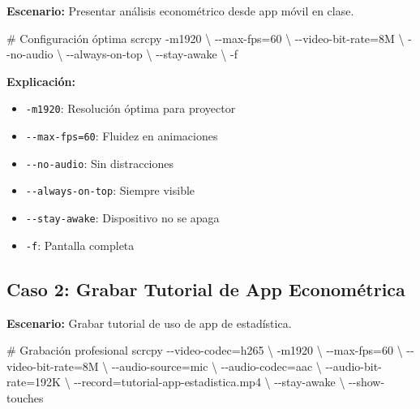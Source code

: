 \documentclass[
  doc,
  floatsintext,
  longtable,
  a4paper,
  nolmodern,
  notxfonts,
  notimes,
  12pt,
  colorlinks=true,linkcolor=blue,citecolor=blue,urlcolor=blue]{apa7}
\newenvironment{Shaded}{\begin{snugshade}}{\end{snugshade}}
\newcommand{\AttributeTok}[1]{\textcolor[rgb]{0.40,0.45,0.13}{#1}}
\newcommand{\CommentTok}[1]{\textcolor[rgb]{0.37,0.37,0.37}{#1}}
\newcommand{\DataTypeTok}[1]{\textcolor[rgb]{0.68,0.00,0.00}{#1}}
\newcommand{\ExtensionTok}[1]{\textcolor[rgb]{0.00,0.23,0.31}{#1}}
\newcommand{\NormalTok}[1]{\textcolor[rgb]{0.00,0.23,0.31}{#1}}
\newcommand{\OperatorTok}[1]{\textcolor[rgb]{0.37,0.37,0.37}{#1}}
\providecommand{\tightlist}{%
  \setlength{\itemsep}{0pt}\setlength{\parskip}{0pt}}
\begin{document}
\textbf{Escenario:} Presentar análisis econométrico desde app móvil en
clase.

\begin{Shaded}
\begin{Highlighting}[]
\CommentTok{\# Configuración óptima}
\ExtensionTok{scrcpy} \AttributeTok{{-}m1920} \DataTypeTok{\textbackslash{}}
  \AttributeTok{{-}{-}max{-}fps}\OperatorTok{=}\NormalTok{60 }\DataTypeTok{\textbackslash{}}
  \AttributeTok{{-}{-}video{-}bit{-}rate}\OperatorTok{=}\NormalTok{8M }\DataTypeTok{\textbackslash{}}
  \AttributeTok{{-}{-}no{-}audio} \DataTypeTok{\textbackslash{}}
  \AttributeTok{{-}{-}always{-}on{-}top} \DataTypeTok{\textbackslash{}}
  \AttributeTok{{-}{-}stay{-}awake} \DataTypeTok{\textbackslash{}}
  \AttributeTok{{-}f}
\end{Highlighting}
\end{Shaded}

\textbf{Explicación:}

\begin{itemize}
\tightlist
\item
  \texttt{-m1920}: Resolución óptima para proyector
\item
  \texttt{-\/-max-fps=60}: Fluidez en animaciones
\item
  \texttt{-\/-no-audio}: Sin distracciones
\item
  \texttt{-\/-always-on-top}: Siempre visible
\item
  \texttt{-\/-stay-awake}: Dispositivo no se apaga
\item
  \texttt{-f}: Pantalla completa
\end{itemize}

\subsection{Caso 2: Grabar Tutorial de App
Econométrica}\label{caso-2-grabar-tutorial-de-app-economuxe9trica}

\textbf{Escenario:} Grabar tutorial de uso de app de estadística.

\begin{Shaded}
\begin{Highlighting}[]
\CommentTok{\# Grabación profesional}
\ExtensionTok{scrcpy} \AttributeTok{{-}{-}video{-}codec}\OperatorTok{=}\NormalTok{h265 }\DataTypeTok{\textbackslash{}}
  \AttributeTok{{-}m1920} \DataTypeTok{\textbackslash{}}
  \AttributeTok{{-}{-}max{-}fps}\OperatorTok{=}\NormalTok{60 }\DataTypeTok{\textbackslash{}}
  \AttributeTok{{-}{-}video{-}bit{-}rate}\OperatorTok{=}\NormalTok{8M }\DataTypeTok{\textbackslash{}}
  \AttributeTok{{-}{-}audio{-}source}\OperatorTok{=}\NormalTok{mic }\DataTypeTok{\textbackslash{}}
  \AttributeTok{{-}{-}audio{-}codec}\OperatorTok{=}\NormalTok{aac }\DataTypeTok{\textbackslash{}}
  \AttributeTok{{-}{-}audio{-}bit{-}rate}\OperatorTok{=}\NormalTok{192K }\DataTypeTok{\textbackslash{}}
  \AttributeTok{{-}{-}record}\OperatorTok{=}\NormalTok{tutorial{-}app{-}estadistica.mp4 }\DataTypeTok{\textbackslash{}}
  \AttributeTok{{-}{-}stay{-}awake} \DataTypeTok{\textbackslash{}}
  \AttributeTok{{-}{-}show{-}touches}
\end{Highlighting}
\end{Shaded}
\end{document}
